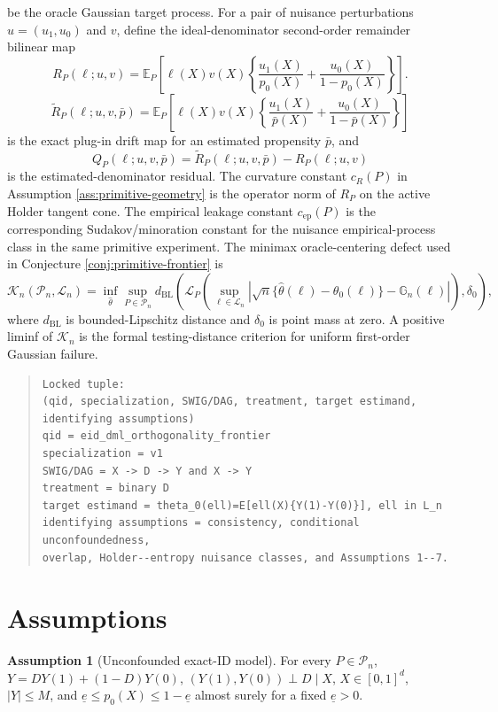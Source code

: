 \documentclass[11pt]{article}
\newcommand{\E}{\mathbb{E}}
\theoremstyle{definition}
\newtheorem{assumption}{Assumption}
\theoremstyle{plain}
\theoremstyle{remark}
\begin{document}
be the oracle Gaussian target process.  For a pair of nuisance perturbations
\(u=(u_1,u_0)\) and \(v\), define the ideal-denominator second-order remainder
bilinear map
\[
R_P(\ell;u,v)=
\E_P\!\left[
\ell(X)v(X)
\left\{\frac{u_1(X)}{p_0(X)}+\frac{u_0(X)}{1-p_0(X)}\right\}
\right].
\]
\[
\widetilde R_P(\ell;u,v,\bar p)=
\E_P\!\left[
\ell(X)v(X)
\left\{\frac{u_1(X)}{\bar p(X)}+\frac{u_0(X)}{1-\bar p(X)}\right\}
\right]
\]
is the exact plug-in drift map for an estimated propensity \(\bar p\), and
\[
Q_P(\ell;u,v,\bar p)=\widetilde R_P(\ell;u,v,\bar p)-R_P(\ell;u,v)
\]
is the estimated-denominator residual.
The curvature constant \(c_R(P)\) in Assumption \ref{ass:primitive-geometry}
is the operator norm of \(R_P\) on the active Holder tangent cone.  The
empirical leakage constant \(c_{\mathrm{ep}}(P)\) is the corresponding
Sudakov/minoration constant for the nuisance empirical-process class in the
same primitive experiment.
The minimax oracle-centering defect used in Conjecture
\ref{conj:primitive-frontier} is
\[
\mathcal{K}_n(\mathcal{P}_n,\mathcal{L}_n)
=
\inf_{\hat\theta}
\sup_{P\in\mathcal{P}_n}
d_{\mathrm{BL}}\!\left(
\mathcal{L}_P\!\left(
\sup_{\ell\in\mathcal{L}_n}
\left|\sqrt n\{\hat\theta(\ell)-\theta_0(\ell)\}-\mathbb{G}_n(\ell)\right|
\right),\delta_0\right),
\]
where \(d_{\mathrm{BL}}\) is bounded-Lipschitz distance and \(\delta_0\) is
point mass at zero.  A positive liminf of \(\mathcal{K}_n\) is the formal
testing-distance criterion for uniform first-order Gaussian failure.

\begin{quote}
\begin{verbatim}
Locked tuple:
(qid, specialization, SWIG/DAG, treatment, target estimand, identifying assumptions)
qid = eid_dml_orthogonality_frontier
specialization = v1
SWIG/DAG = X -> D -> Y and X -> Y
treatment = binary D
target estimand = theta_0(ell)=E[ell(X){Y(1)-Y(0)}], ell in L_n
identifying assumptions = consistency, conditional unconfoundedness,
overlap, Holder--entropy nuisance classes, and Assumptions 1--7.
\end{verbatim}
\end{quote}

\section{Assumptions}
\begin{assumption}[Unconfounded exact-ID model]\label{ass:unconfounded}
For every \(P\in\mathcal{P}_n\), \(Y=DY(1)+(1-D)Y(0)\),
\((Y(1),Y(0))\perp D\mid X\), \(X\in[0,1]^d\), \(|Y|\le M\), and
\(\underline e\le p_0(X)\le1-\underline e\) almost surely for a fixed
\(\underline e>0\).
\end{assumption}
\end{document}
